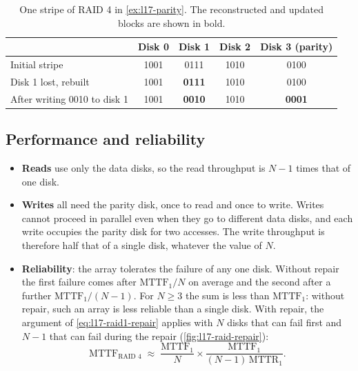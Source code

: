 \documentclass[../main.tex]{subfiles}
\begin{document}
\begin{table}[htbp]
  \centering\small
  \caption{One stripe of RAID 4 in \cref{ex:l17-parity}.  The reconstructed
    and updated blocks are shown in bold.}
  \label{tab:l17-parity}
  \begin{tabular}{@{}lcccc@{}}
    \toprule
    & Disk 0 & Disk 1 & Disk 2 & Disk 3 (parity) \\
    \midrule
    Initial stripe            & 1001 & 0111 & 1010 & 0100 \\
    Disk 1 lost, rebuilt      & 1001 & \textbf{0111} & 1010 & 0100 \\
    After writing 0010 to disk 1 & 1001 & \textbf{0010} & 1010 & \textbf{0001} \\
    \bottomrule
  \end{tabular}
\end{table}

\subsection{Performance and reliability}

\begin{itemize}
  \item \textbf{Reads} use only the data disks, so the read throughput is
    $N-1$ times that of one disk.
  \item \textbf{Writes} all need the parity disk, once to read and once to
    write.  Writes cannot proceed in parallel even when they go to different
    data disks, and each write occupies the parity disk for two accesses.
    The write throughput is therefore half that of a single disk, whatever
    the value of $N$.
  \item \textbf{Reliability}: the array tolerates the failure of any one
    disk.  Without repair the first failure comes after
    $\mathrm{MTTF}_1/N$ on average and the second after a further
    $\mathrm{MTTF}_1/(N-1)$.  For $N \ge 3$ the sum is less than
    $\mathrm{MTTF}_1$: without repair, such an array is less reliable than a
    single disk.  With repair, the argument of \cref{eq:l17-raid1-repair}
    applies with $N$ disks that can fail first and $N-1$ that can fail
    during the repair (\cref{fig:l17-raid-repair}):
    \begin{equation}
      \mathrm{MTTF}_{\text{RAID 4}} \;\approx\;
      \frac{\mathrm{MTTF}_1}{N} \times
      \frac{\mathrm{MTTF}_1}{(N-1)\,\mathrm{MTTR}_1} .
      \label{eq:l17-raid4}
    \end{equation}
\end{itemize}
\end{document}
